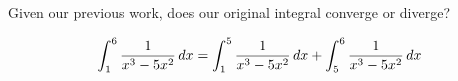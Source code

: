 \documentclass{ximera}
\begin{document}
\begin{exercise}
\begin{exercise}
\begin{exercise}
\begin{exercise}

Given our previous work, does our original integral converge or diverge?


\[
\int _{1}^{6} \frac{1}{x^{3}-5x^{2}} \mathop{}\!d x=\int_{1}^{5} \frac{1}{x^{3}-5x^{2}} \mathop{}\!d x + \int_{5}^{6} \frac{1}{x^{3}-5x^{2}} \mathop{}\!d x
\]

\begin{multipleChoice}
\end{multipleChoice}


\end{exercise}


\end{exercise}
\end{exercise}
\end{exercise}
\end{document}

